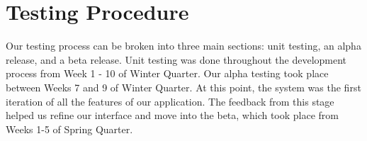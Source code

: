 \chapter{Testing Procedure}

Our testing process can be broken into three main sections: unit testing, an alpha release, and a beta release. Unit testing was done throughout the development process from Week 1 - 10 of Winter Quarter. Our alpha testing took place between Weeks 7 and 9 of Winter Quarter. At this point, the system was the first iteration of all the features of our application. The feedback from this stage helped us refine our interface and move into the beta, which took place from Weeks 1-5 of Spring Quarter.
